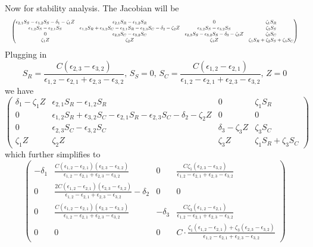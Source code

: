 \documentclass[12pt,a4paper]{exam}
\begin{document}
Now for stability analysis. The Jacobian will be
\[
    \resizebox{\linewidth}{!}{%
    $\displaystyle
    \begin{pmatrix}
        \epsilon_{2, 1} S_S - \epsilon_{1, 2} S_S - \delta_1 - \zeta_1 Z & \epsilon_{2, 1} S_R - \epsilon_{1, 2} S_R & 0 & \zeta_1 S_R \\
        \epsilon_{1, 2} S_S - \epsilon_{2, 1} S_S & \epsilon_{1, 2} S_R + \epsilon_{3, 2} S_C - \epsilon_{2, 1} S_R - \epsilon_{2, 3} S_C - \delta_2 - \zeta_2 Z & \epsilon_{3, 2} S_S - \epsilon_{3, 2} S_S & \zeta_2 S_S \\
        0 & \epsilon_{2, 3} S_C - \epsilon_{3, 2} S_C & \epsilon_{2, 3} S_S - \epsilon_{3, 2} S_S - \delta_3 - \zeta_3 Z & \zeta_3 S_C \\
        \zeta_1 Z & \zeta_2 Z & \zeta_3 Z & \zeta_1 S_R + \zeta_2 S_S + \zeta_3 S_C
    \end{pmatrix}
    $}
\]
Plugging in
\[
    S_R = \frac{C (\epsilon_{2,3} - \epsilon_{3,2})}{\epsilon_{1,2} - \epsilon_{2,1} + \epsilon_{2,3} - \epsilon_{3,2}},\,
    S_S = 0,\,
    S_C = \frac{C (\epsilon_{1,2} - \epsilon_{2,1})}{\epsilon_{1,2} - \epsilon_{2,1} + \epsilon_{2,3} - \epsilon_{3,2}},\,
    Z = 0
\]
we have
\[
    \begin{pmatrix}
        \delta_1 - \zeta_1 Z & \epsilon_{2, 1} S_R - \epsilon_{1, 2} S_R & 0 & \zeta_1 S_R \\
        0 & \epsilon_{1, 2} S_R + \epsilon_{3, 2} S_C - \epsilon_{2, 1} S_R - \epsilon_{2, 3} S_C - \delta_2 - \zeta_2 Z & 0 & 0 \\
        0 & \epsilon_{2, 3} S_C - \epsilon_{3, 2} S_C & \delta_3 - \zeta_3 Z & \zeta_3 S_C \\
        \zeta_1 Z & \zeta_2 Z & \zeta_3 Z & \zeta_1 S_R + \zeta_3 S_C
    \end{pmatrix}
\]
which further simplifies to
\[
    \begin{pmatrix}
        - \delta_1 & \frac{C (\epsilon_{1, 2} - \epsilon_{2, 1})(\epsilon_{2,3} - \epsilon_{3,2})}{\epsilon_{1,2} - \epsilon_{2,1} + \epsilon_{2,3} - \epsilon_{3,2}} & 0 & \frac{C \zeta_1 (\epsilon_{2,3} - \epsilon_{3,2})}{\epsilon_{1,2} - \epsilon_{2,1} + \epsilon_{2,3} - \epsilon_{3,2}} \\
        0 & \frac{2 C (\epsilon_{1, 2} - \epsilon_{2, 1})(\epsilon_{2,3} - \epsilon_{3,2})}{\epsilon_{1,2} - \epsilon_{2,1} + \epsilon_{2,3} - \epsilon_{3,2}} - \delta_2 & 0 & 0\\
        0 & \frac{C (\epsilon_{1, 2} - \epsilon_{2, 1})(\epsilon_{2,3} - \epsilon_{3,2})}{\epsilon_{1,2} - \epsilon_{2,1} + \epsilon_{2,3} - \epsilon_{3,2}} & - \delta_3 & \frac{C \zeta_3 (\epsilon_{1,2} - \epsilon_{2,1})}{\epsilon_{1,2} - \epsilon_{2,1} + \epsilon_{2,3} - \epsilon_{3,2}} \\
        0 & 0 & 0 & C \cdot \frac{\zeta_1 (\epsilon_{1, 2} - \epsilon_{2, 1}) + \zeta_3 (\epsilon_{2,3} - \epsilon_{3,2})}{\epsilon_{1,2} - \epsilon_{2,1} + \epsilon_{2,3} - \epsilon_{3,2}}
    \end{pmatrix}
\]
\end{document}
